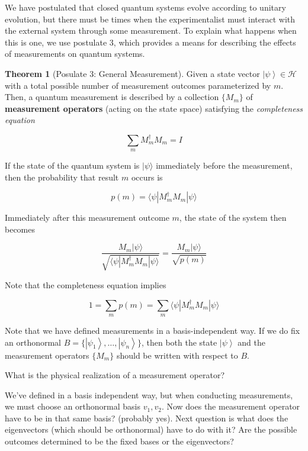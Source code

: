 \documentclass{article}
\newenvironment{question}{\color{blue}}{\ignorespacesafterend}
\newcommand{\ket}[1]{\ensuremath{\left|#1\right\rangle}}
\theoremstyle{definition}
\newtheorem{theorem}{Theorem}[section]
\begin{document}
    We have postulated that closed quantum systems evolve according to unitary evolution, but there must be times when the experimentalist must interact with the external system through some measurement. To explain what happens when this is one, we use postulate 3, which provides a means for describing the effects of measurements on quantum systems. 

    \begin{theorem}[Posulate 3: General Measurement]
      Given a state vector $\ket{\psi} \in \mathcal{H}$ with a total possible number of measurement outcomes parameterized by $m$. Then, a quantum measurement is described by a collection $\{M_m\}$ of \textbf{measurement operators} (acting on the state space) satisfying the \textit{completeness equation}

        \[\sum_{m} M_m^\dagger M_m = I\]

      If the state of the quantum system is $|\psi \rangle$ immediately before the measurement, then the probability that result $m$ occurs is

        \[p(m) = \langle \psi | M_m^\dagger M_m | \psi \rangle\]

      Immediately after this measurement outcome $m$, the state of the system then becomes

        \[\frac{M_m |\psi \rangle}{\sqrt{\langle \psi| M_m^\dagger M_m |\psi \rangle}} = \frac{M_m |\psi \rangle}{\sqrt{p(m)}}\]

      Note that the completeness equation implies

        \[1 = \sum_m p(m) = \sum_m \langle \psi | M_m^\dagger M_m | \psi \rangle\]

      Note that we have defined measurements in a basis-independent way. If we do fix an orthonormal $B = \{ \ket{\psi_1}, \ldots, \ket{\psi_n}\}$, then both the state $\ket{\psi}$ and the measurement operators $\{M_m\}$ should be written with respect to $B$. 

    \end{theorem}

    \begin{question} 
      What is the physical realization of a measurement operator? 

      We've defined in a basis independent way, but when conducting measurements, we must choose an orthonormal basis $v_1, v_2$. Now does the measurement operator have to be in that same basis? (probably yes). Next question is what does the eigenvectors (which should be orthonormal) have to do with it? Are the possible outcomes determined to be the fixed bases or the eigenvectors? 
    \end{question}
\end{document}
